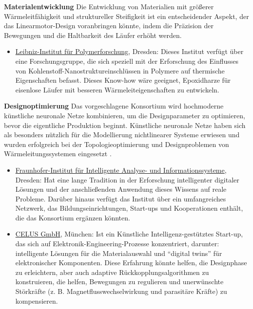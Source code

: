 \documentclass[
  oneside]{book}
\providecommand{\tightlist}{%
  \setlength{\itemsep}{0pt}\setlength{\parskip}{0pt}}
\begin{document}
\textbf{Materialentwicklung} Die Entwicklung von Materialien mit größerer Wärmeleitfähigkeit und struktureller Steifigkeit ist ein entscheidender Aspekt, der das Linearmotor-Design voranbringen könnte, indem die Präzision der Bewegungen und die Haltbarkeit des Läufer erhöht werden.

\begin{itemize}
\tightlist
\item
  \href{https://www.ipfdd.de/de/forschung/institut-fur-makromolekulare-chemie/funktionale-nanokomposite-und-blends/forschungsfelder/kohlenstoffhaltige-verbundwerkstoffe\%20-Nanostrukturen/}{Leibniz-Institut für Polymerforschung}, Dresden: Dieses Institut verfügt über eine Forschungsgruppe, die sich speziell mit der Erforschung des Einflusses von Kohlenstoff-Nanostruktureinschlüssen in Polymere auf thermische Eigenschaften befasst. Dieses Know-how wäre geeignet, Epoxidharze für eisenlose Läufer mit besseren Wärmeleiteigenschaften zu entwickeln.
\end{itemize}

\textbf{Designoptimierung} Das vorgeschlagene Konsortium wird hochmoderne künstliche neuronale Netze kombinieren, um die Designparameter zu optimieren, bevor die eigentliche Produktion beginnt. Künstliche neuronale Netze haben sich als besonders nützlich für die Modellierung nichtlinearer Systeme erwiesen und wurden erfolgreich bei der Topologieoptimierung und Designproblemen von Wärmeleitungssystemen eingesetzt \citep{zhang2021}.

\begin{itemize}
\item
  \href{https://www.iais.fraunhofer.de/}{Fraunhofer-Institut für Intelligente Analyse- und Informationssysteme}, Dresden: Hat eine lange Tradition in der Erforschung intelligenter digitaler Lösungen und der anschließenden Anwendung dieses Wissens auf reale Probleme. Darüber hinaus verfügt das Institut über ein umfangreiches Netzwerk, das Bildungseinrichtungen, Start-ups und Kooperationen enthält, die das Konsortium ergänzen könnten.
\item
  \href{https://www.celus.io/}{CELUS GmbH}, München: Ist ein Künstliche Intelligenz-gestütztes Start-up, das sich auf Elektronik-Engineering-Prozesse konzentriert, darunter: intelligente Lösungen für die Materialauswahl und ``digital twins'' für elektronischer Komponenten. Diese Erfahrung könnte helfen, die Designphase zu erleichtern, aber auch adaptive Rückkopplungsalgorithmen zu konstruieren, die helfen, Bewegungen zu regulieren und unerwünschte Störkräfte (z. B. Magnetflusswechselwirkung und parasitäre Kräfte) zu kompensieren.
\end{itemize}
\end{document}
